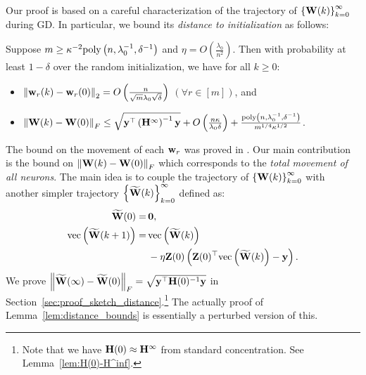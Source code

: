 Our proof is based on a careful characterization of the trajectory of $\left\{\mathbf{W}(k) \right\}_{k=0}^\infty$ during GD.
In particular, we bound its \emph{distance to initialization} as follows:
\begin{lem}\label{lem:distance_bounds}
	Suppose $m \ge \kappa^{-2} \mathrm{poly}\left(n, \lambda_0^{-1}, \delta^{-1} \right)  $ and $\eta = O\left( \frac{\lambda_0}{n^2} \right)$.
	Then with probability at least $1-\delta$ over the random initialization, we have for all $k\ge0$:
	\begin{itemize}
		\item $\left\|\mathbf{w}_r(k) - \mathbf{w}_r(0)\right\|_2 =O\left( \frac{ n }{\sqrt m \lambda_0\sqrt{\delta}} \right)$ $(\forall r\in[m])$, and
		\item $\left\|\mathbf{W}(k)-\mathbf{W}(0)\right\|_{F} \le \sqrt{\mathbf{y}^\top \left(\mathbf{H}^{\infty}\right)^{-1}\mathbf{y}} + O\left( \frac{  n \kappa}{\lambda_0 \delta} \right) + \frac{\mathrm{poly}\left(n, \lambda_0^{-1}, \delta^{-1} \right)}{m^{1/4} \kappa^{1/2}} $.
	\end{itemize}
\end{lem}
The bound on the movement of each $\mathbf{w}_r$ was proved in \cite{du2018provably}. %
Our main contribution is the bound on $\left\|\mathbf{W}(k)-\mathbf{W}(0)\right\|_F$ which corresponds to the \emph{total movement of all neurons}.
The main idea is to couple the trajectory of $\left\{\mathbf{W}(k) \right\}_{k=0}^\infty$ with another simpler trajectory $\left\{\widetilde{\mathbf{W}}(k)\right\}_{k=0}^\infty$ defined as:
\begin{align}
\widetilde{\mathbf{W}}(0) =\,& \mathbf{0}, \nonumber\\
\text{vec}\left(\widetilde{\mathbf{W}}(k+1)\right) =\,& \text{vec}\left(\widetilde{\mathbf{W}}(k)\right) \label{eqn:W_tilde_traj} \\&- \eta\mathbf{Z}(0)\left( \mathbf{Z}(0)^\top \text{vec}\left(\widetilde{\mathbf{W}}(k)\right)-\mathbf{y}\right). \nonumber
\end{align}
We prove $\left\|\widetilde{\mathbf{W}}(\infty) - \widetilde{\mathbf{W}}(0)\right\|_F = \sqrt{\mathbf{y}^\top \mathbf{H}(0)^{-1} \mathbf{y}}$ in Section~\ref{sec:proof_sketch_distance}.\footnote{Note that we have $\mathbf{H}(0) \approx \mathbf{H}^\infty$ from standard concentration. See Lemma~\ref{lem:H(0)-H^inf}.}
The actually proof of Lemma~\ref{lem:distance_bounds} is essentially a perturbed version of this.



